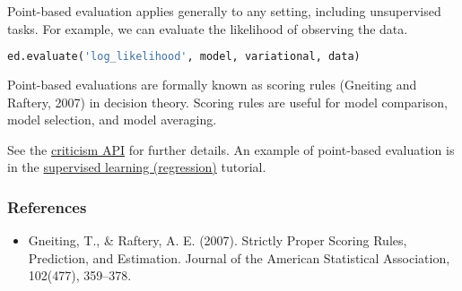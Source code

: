 Point-based evaluation applies generally to any setting, including
unsupervised tasks. For example, we can evaluate the likelihood of
observing the data.
\begin{lstlisting}[language=Python]
ed.evaluate('log_likelihood', model, variational, data)
\end{lstlisting}

Point-based evaluations are formally known as scoring rules (Gneiting
and Raftery, 2007) in decision theory. Scoring rules are
useful for model comparison, model selection, and model averaging.

See the \href{api/criticisms.html}{criticism API} for further details.
An example of point-based evaluation is in the
\href{tut_supervised_regression.html}{supervised learning
(regression)} tutorial.

\subsubsection{References}\label{references}

\begin{itemize}
\item
  Gneiting, T., & Raftery, A. E. (2007). Strictly Proper Scoring
  Rules, Prediction, and Estimation. Journal of the American
  Statistical Association, 102(477), 359–378.
\end{itemize}
